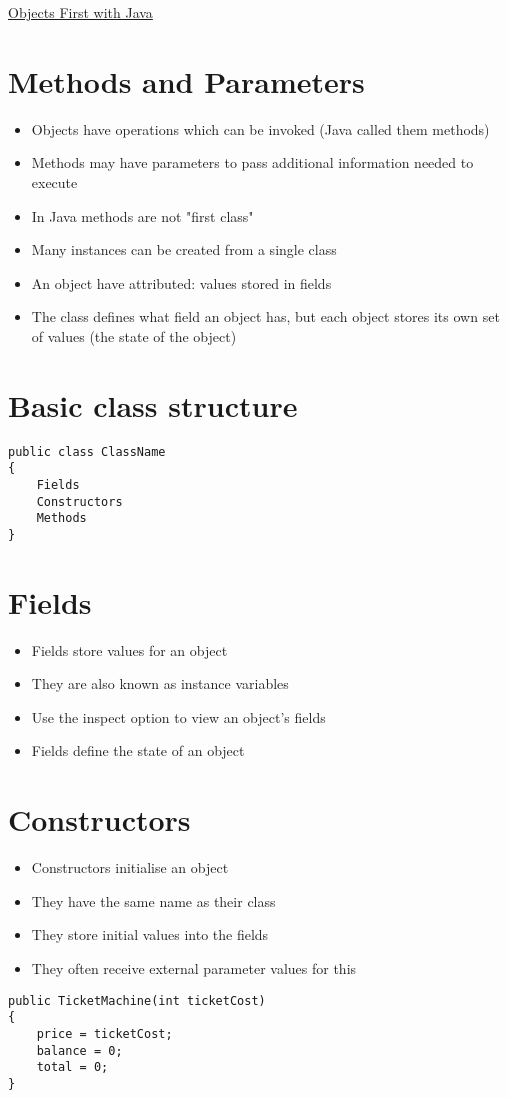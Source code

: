 \documentclass{article}[18pt]
\begin{document}
\begin{center}
\underline{\huge Objects First with Java}
\end{center}
\section{Methods and Parameters}
\begin{itemize}
	\item Objects have operations which can be invoked (Java called them methods)
	\item Methods may have parameters to pass additional information needed to execute
	\item In Java methods are not "first class"
	\item Many instances can be created from a single class
	\item An object have attributed: values stored in fields
	\item The class defines what field an object has, but each object stores its own set of values (the state of the object)
\end{itemize}
\section{Basic class structure}
\begin{verbatim}
public class ClassName
{
	Fields
	Constructors
	Methods
} 
\end{verbatim}
\section{Fields}
\begin{itemize}
	\item Fields store values for an object
	\item They are also known as instance variables
	\item Use the inspect option to view an object's fields
	\item Fields define the state of an object
\end{itemize}
\section{Constructors}
\begin{itemize}
	\item Constructors initialise an object
	\item They have the same name as their class
	\item They store initial values into the fields
	\item They often receive external parameter values for this
\end{itemize}
\begin{verbatim}
public TicketMachine(int ticketCost)
{
	price = ticketCost;
	balance = 0;
	total = 0;
}
\end{verbatim}
\end{document}
